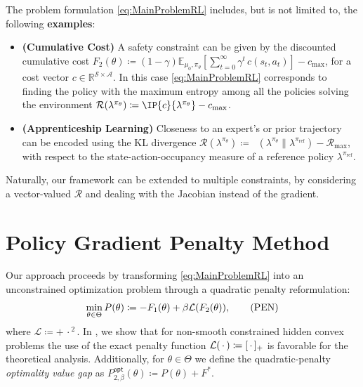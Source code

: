 \documentclass{article}
\theoremstyle{plain}
\theoremstyle{definition}
\theoremstyle{remark}
\def\RR{{\mathbb{R}}}
\def\SS{{\mathcal{S}}}
\def\AA{{\mathcal{A}}}
\newcommand{\Expu}[2]{{\mathbb{E}}_{#1}\!\left[#2\right]}
\newcommand{\innerEmpty}{\,\cdot\,}
\DeclarePairedDelimiter{\paren}{(}{)}
\DeclarePairedDelimiter{\plus}{[}{]_{+}}
\newcommand{\pen}[1]{{\plus{#1}^2}}
\newcommand{\penGenNot}{{\mathcal{L}}}
\newcommand{\penGen}[1]{{\penGenNot\paren{#1}}}
\newcommand{\define}{\coloneqq}
\DeclareMathOperator{\klDiv}{\mathsf{D}_\mathsf{KL}}
\def\xx{{\theta}}
\def\optLabel{\mathsf{opt}}
\newcommand{\penOpt}[1]{P^\optLabel_{#1}}
\def\refPol{{\mathrm{ref}}}
\newcommand{\KL}[2]{{\klDiv\left(#1 \lVert #2 \right)}}
\def\XX{{\Theta}}
\def\Fopt{{F^*}}
\def\Reg{{\mathcal{R}}}
\def\rMax{{\mathcal{R}_{\max}}}
\def\cMax{{c_{\max}}}
\begin{document}
The problem formulation \eqref{eq:MainProblemRL} includes, but is not
limited to, the following \textbf{examples}:
\begin{itemize}
 \item \textbf{(Cumulative Cost)} A safety constraint can be given
       by the discounted cumulative cost
       $F_2(\theta) \define
        (1-\gamma)\Expu{\mu_0,\pi_\theta}{\sum_{t=0}^{\infty}
         \gamma^t \, c(s_t, a_t)}-\cMax$, for a cost vector
       $c \in \RR^{\SS \times \AA}$. In this case \eqref{eq:MainProblemRL}
       corresponds to finding the policy with
       the maximum entropy among all the policies solving the environment
       $\Reg(\lambda^{\pi_\theta}) \define \IP{c}{\lambda^{\pi_\theta}} - \cMax$.
 \item \textbf{(Apprenticeship Learning)} Closeness to an expert's or prior trajectory
       can be encoded using the KL divergence
       $\Reg(\lambda^{\pi_\theta}) \define \KL{\lambda^{\pi_\theta}}{\lambda^{\pi_\refPol}} - \rMax$,
       with respect to the state-action-occupancy measure of a reference policy
       $\lambda^{\pi_\refPol}$.
\end{itemize}
Naturally, our framework can be extended to multiple constraints, by
considering a vector-valued $\Reg$ and dealing with the Jacobian instead
of the gradient.

\section{Policy Gradient Penalty Method}
\label{sec:PgpAlgorithm}
Our approach proceeds by transforming \eqref{eq:MainProblemRL}
into an unconstrained optimization problem through a quadratic
penalty reformulation:
\begin{align}
 \min_{\theta\in\Theta} P(\theta) \define -F_1(\theta) + \beta \penGen{F_2(\theta)},
 \tag{PEN}
 \label{eq:MainPenalty}
\end{align}
where $\penGenNot \define \pen{\innerEmpty{}}$.
In , we show that
for non-smooth constrained hidden convex problems the use of
the exact penalty function
$\penGen{\innerEmpty{}}  \define \plus{\innerEmpty}$
is favorable for the theoretical analysis.
Additionally, for $\xx\in\XX$ we define the quadratic-penalty
\emph{optimality value gap} as $\penOpt{2,\beta}(\xx)\define P(\xx)+\Fopt$.
\end{document}
